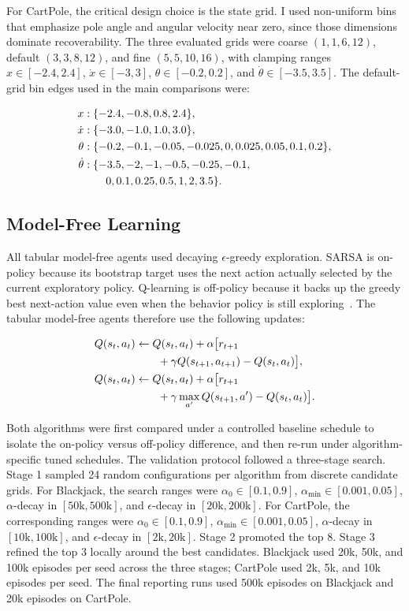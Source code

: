 \documentclass[letterpaper, 10 pt, conference]{ieeeconf}
\begin{document}
For CartPole, the critical design choice is the state grid. I used non-uniform bins that emphasize pole angle and angular velocity near zero, since those dimensions dominate recoverability. The three evaluated grids were coarse $(1, 1, 6, 12)$, default $(3, 3, 8, 12)$, and fine $(5, 5, 10, 16)$, with clamping ranges $x \in [-2.4, 2.4]$, $\dot{x} \in [-3, 3]$, $\theta \in [-0.2, 0.2]$, and $\dot{\theta} \in [-3.5, 3.5]$. The default-grid bin edges used in the main comparisons were:

\begin{align*}
x &: \{-2.4, -0.8, 0.8, 2.4\}, \\
\dot{x} &: \{-3.0, -1.0, 1.0, 3.0\}, \\
\theta &: \{-0.2, -0.1, -0.05, -0.025, 0, 0.025, 0.05, 0.1, 0.2\}, \\
\dot{\theta} &: \{-3.5, -2, -1, -0.5, -0.25, -0.1,\notag \\
&\qquad 0, 0.1, 0.25, 0.5, 1, 2, 3.5\}.
\end{align*}

\subsection{Model-Free Learning}

All tabular model-free agents used decaying $\epsilon$-greedy exploration. SARSA is on-policy because its bootstrap target uses the next action actually selected by the current exploratory policy. Q-learning is off-policy because it backs up the greedy best next-action value even when the behavior policy is still exploring~\cite{sutton2018reinforcement}. The tabular model-free agents therefore use the following updates:

\begin{align}
Q(s_t, a_t) &\leftarrow Q(s_t, a_t) + \alpha \bigl[r_{t+1} \notag \\
&\qquad + \gamma Q(s_{t+1}, a_{t+1}) - Q(s_t, a_t)\bigr], \\
Q(s_t, a_t) &\leftarrow Q(s_t, a_t) + \alpha \bigl[r_{t+1} \notag \\
&\qquad + \gamma \max_{a'} Q(s_{t+1}, a') - Q(s_t, a_t)\bigr].
\end{align}

Both algorithms were first compared under a controlled baseline schedule to isolate the on-policy versus off-policy difference, and then re-run under algorithm-specific tuned schedules. The validation protocol followed a three-stage search. Stage 1 sampled 24 random configurations per algorithm from discrete candidate grids. For Blackjack, the search ranges were $\alpha_{0} \in [0.1, 0.9]$, $\alpha_{\min} \in [0.001, 0.05]$, $\alpha$-decay in $[50\text{k}, 500\text{k}]$, and $\epsilon$-decay in $[20\text{k}, 200\text{k}]$. For CartPole, the corresponding ranges were $\alpha_{0} \in [0.1, 0.9]$, $\alpha_{\min} \in [0.001, 0.05]$, $\alpha$-decay in $[10\text{k}, 100\text{k}]$, and $\epsilon$-decay in $[2\text{k}, 20\text{k}]$. Stage 2 promoted the top 8. Stage 3 refined the top 3 locally around the best candidates. Blackjack used 20k, 50k, and 100k episodes per seed across the three stages; CartPole used 2k, 5k, and 10k episodes per seed. The final reporting runs used 500k episodes on Blackjack and 20k episodes on CartPole.
\end{document}
